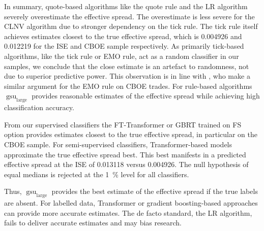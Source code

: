 In summary, quote-based algorithms like the quote rule and the \gls{LR} algorithm severely overestimate the effective spread. The overestimate is less severe for the \gls{CLNV} algorithm due to stronger dependency on the tick rule. The tick rule itself achieves estimates closest to the true effective spread, which is \num[round-mode=places, round-precision=3]{0.004926} and \num[round-mode=places, round-precision=3]{0.012219} for the \gls{ISE} and \gls{CBOE} sample respectively. As primarily tick-based algorithms, like the tick rule or \gls{EMO} rule, act as a random classifier in our samples, we conclude that the close estimate is an artefact to randomness, not due to superior predictive power. This observation is in line with \textcite[][897]{savickasInferringDirectionOption2003}, who make a similar argument for the \gls{EMO} rule on \gls{CBOE} trades. For rule-based algorithms $\operatorname{gsu}_{\mathrm{large}}$ provides reasonable estimates of the effective spread while achieving high classification accuracy.

From our supervised classifiers the FT-Transformer or \gls{GBRT} trained on \gls{FS} option provides estimates closest to the true effective spread, in particular on the \gls{CBOE} sample. For semi-supervised classifiers, Transformer-based models approximate the true effective spread best. This best manifests in a predicted effective spread at the \gls{ISE} of \num[round-mode=places, round-precision=3]{0.013118} versus \num[round-mode=places, round-precision=3]{0.004926}. The null hypothesis of equal medians is rejected at the \SI{1}{\percent} level for all classifiers.


Thus, $\operatorname{gsu}_{\mathrm{large}}$ provides the best estimate of the effective spread if the true labels are absent. For labelled data, Transformer or gradient boosting-based approaches can provide more accurate estimates. The de facto standard, the \gls{LR} algorithm, fails to deliver accurate estimates and may bias research.
